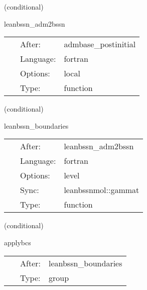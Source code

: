 \vspace{5mm}

   (conditional) 

\hspace{5mm} leanbssn\_adm2bssn 

\hspace{5mm}{\it convert initial data into bssn variables } 


\hspace{5mm}

 \begin{tabular*}{160mm}{cll} 
~ & After:  & admbase\_postinitial \\ 
~ & Language:  & fortran \\ 
~ & Options:  & local \\ 
~ & Type:  & function \\ 
\end{tabular*} 


\vspace{5mm}

   (conditional) 

\hspace{5mm} leanbssn\_boundaries 

\hspace{5mm}{\it boundary enforcement } 


\hspace{5mm}

 \begin{tabular*}{160mm}{cll} 
~ & After:  & leanbssn\_adm2bssn \\ 
~ & Language:  & fortran \\ 
~ & Options:  & level \\ 
~ & Sync:  & leanbssnmol::gammat \\ 
~ & Type:  & function \\ 
\end{tabular*} 


\vspace{5mm}

   (conditional) 

\hspace{5mm} applybcs 

\hspace{5mm}{\it apply boundary conditions } 


\hspace{5mm}

 \begin{tabular*}{160mm}{cll} 
~ & After:  & leanbssn\_boundaries \\ 
~ & Type:  & group \\ 
\end{tabular*} 


